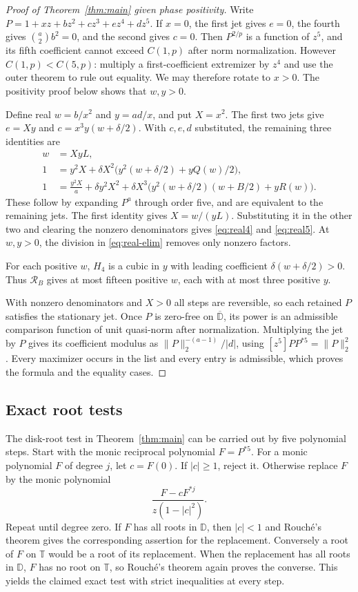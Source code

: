 \documentclass[11pt]{article}
\newcommand{\D}{\mathbb D}
\newcommand{\T}{\mathbb T}
\begin{document}
\begin{proof}[Proof of Theorem~\ref{thm:main} given phase positivity]
Write \(P=1+xz+bz^2+cz^3+ez^4+dz^5\).
If \(x=0\), the first jet gives \(e=0\), the fourth gives
\(\binom{a}{2}b^2=0\), and the second gives \(c=0\).
Then \(P^{2/p}\) is a function of \(z^5\), and its fifth
coefficient cannot exceed \(C(1,p)\) after norm normalization.
However \(C(1,p)<C(5,p)\): multiply a first-coefficient extremizer
by \(z^4\) and use the outer theorem to rule out equality.
We may therefore rotate to \(x>0\). The positivity proof below shows that \(w,y>0\).

Define real \(w=b/x^2\) and \(y=ad/x\), and put \(X=x^2\).
The first two jets give \(e=Xy\) and \(c=x^3y(w+\delta/2)\).
With \(c,e,d\) substituted, the remaining three identities are
\begin{align*}
 w&=XyL,\\
 1&=y^2 X+\delta X^2\bigl(y^2(w+\delta/2)+yQ(w)/2\bigr),\\
 1&=\frac{y^2X}{a}+\delta y^2X^2+
        \delta X^3\bigl(y^2(w+\delta/2)(w+B/2)+yR(w)\bigr).
\end{align*}
These follow by expanding \(P^a\) through order five, and are
equivalent to the remaining jets. The first identity gives \(X=w/(yL)\). Substituting it in the
other two and clearing the nonzero denominators gives
\eqref{eq:real4} and \eqref{eq:real5}. At \(w,y>0\), the
division in \eqref{eq:real-elim} removes only nonzero factors.

For each positive \(w\), \(H_4\) is a cubic in \(y\) with
leading coefficient \(\delta(w+\delta/2)>0\). Thus
\(\mathcal R_B\) gives at most fifteen positive \(w\), each
with at most three positive \(y\).

With nonzero denominators and \(X>0\) all steps are reversible,
so each retained \(P\) satisfies the stationary jet.
Once \(P\) is zero-free on \(\overline{\D}\), its power is
an admissible comparison function of unit quasi-norm after
normalization. Multiplying the jet by \(P\) gives its coefficient
modulus as \(\|P\|_2^{-(a-1)}/|d|\), using
\([z^5]PP^{*5}=\|P\|_2^2\). Every maximizer occurs in the list
and every entry is admissible, which proves the formula and
the equality cases.
\end{proof}

\subsection{Exact root tests}

The disk-root test in Theorem~\ref{thm:main} can be carried out
by five polynomial steps. Start with the monic reciprocal
polynomial \(F=P^{*5}\). For a monic polynomial \(F\) of
degree \(j\), let \(c=F(0)\). If \(|c|\geq1\), reject it.
Otherwise replace \(F\) by the monic polynomial
\[
 \frac{F-cF^{*j}}{z(1-|c|^2)} .
\]
Repeat until degree zero. If \(F\) has all roots in \(\D\),
then \(|c|<1\) and Rouch\'e's theorem gives the corresponding
assertion for the replacement. Conversely a root of \(F\) on
\(\T\) would be a root of its replacement. When the replacement
has all roots in \(\D\), \(F\) has no root on \(\T\), so
Rouch\'e's theorem again proves the converse. This yields the
claimed exact test with strict inequalities at every step.
\end{document}
